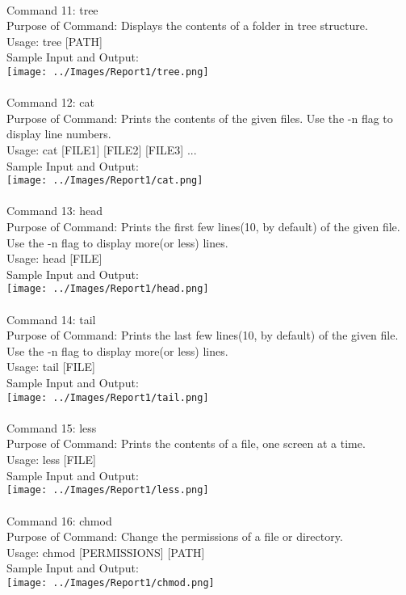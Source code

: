 \documentclass[10pt,a4paper]{report}
\begin{document}
\\
Command 11: tree\\
Purpose of Command: Displays the contents of a folder in tree structure.\\
Usage: tree [PATH]\\
Sample Input and Output: \\
\texttt{[image: ../Images/Report1/tree.png]}\\
\pagebreak
\\
Command 12: cat\\
Purpose of Command: Prints the contents of the given files. Use the -n flag to display line numbers.\\
Usage: cat [FILE1] [FILE2] [FILE3] ...\\
Sample Input and Output: \\
\texttt{[image: ../Images/Report1/cat.png]}\\
\\
Command 13: head\\
Purpose of Command: Prints the first few lines(10, by default) of the given file. Use the -n flag to display more(or less) lines.\\
Usage: head [FILE]\\
Sample Input and Output: \\
\texttt{[image: ../Images/Report1/head.png]}\\
\pagebreak
\\
Command 14: tail\\
Purpose of Command: Prints the last few lines(10, by default) of the given file. Use the -n flag to display more(or less) lines.\\
Usage: tail [FILE]\\
Sample Input and Output: \\
\texttt{[image: ../Images/Report1/tail.png]}\\
\\
Command 15: less\\
Purpose of Command: Prints the contents of a file, one screen at a time.\\
Usage: less [FILE]\\
Sample Input and Output: \\
\texttt{[image: ../Images/Report1/less.png]}\\
\pagebreak
\\
Command 16: chmod\\
Purpose of Command: Change the permissions of a file or directory.\\
Usage: chmod [PERMISSIONS] [PATH]\\
Sample Input and Output: \\
\texttt{[image: ../Images/Report1/chmod.png]}\\
\\
\end{document}
